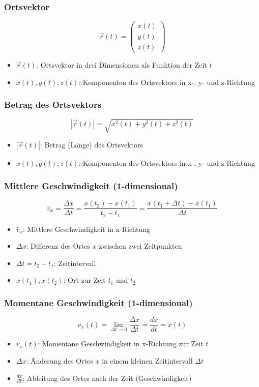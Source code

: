 \documentclass[a4paper, 8pt]{extarticle}
\begin{document}
\begin{landscape}
\begin{multicols*}{3}
\subsubsection{Ortsvektor}
\[
\vec{r}(t) = \begin{pmatrix} x(t) \\ y(t) \\ z(t) \end{pmatrix}
\]
{\footnotesize
\begin{itemize}
    \item \( \vec{r}(t) \): Ortsvektor in drei Dimensionen als Funktion der Zeit \( t \)
    \item \( x(t), y(t), z(t) \): Komponenten des Ortsvektors in x-, y- und z-Richtung
\end{itemize}
}

\subsubsection{Betrag des Ortsvektors}
\[
|\vec{r}(t)| = \sqrt{x^2(t) + y^2(t) + z^2(t)}
\]
{\footnotesize
\begin{itemize}
    \item \( |\vec{r}(t)| \): Betrag (Länge) des Ortsvektors
    \item \( x(t), y(t), z(t) \): Komponenten des Ortsvektors in x-, y- und z-Richtung
\end{itemize}
}

\subsubsection{Mittlere Geschwindigkeit (1-dimensional)}
\[
\bar{v}_x = \frac{\Delta x}{\Delta t} = \frac{x(t_2) - x(t_1)}{t_2 - t_1} = \frac{x(t_1 + \Delta t) - x(t_1)}{\Delta t}
\]
{\footnotesize
\begin{itemize}
    \item \( \bar{v}_x \): Mittlere Geschwindigkeit in x-Richtung
    \item \( \Delta x \): Differenz des Ortes \( x \) zwischen zwei Zeitpunkten
    \item \( \Delta t = t_2 - t_1 \): Zeitintervall
    \item \( x(t_1), x(t_2) \): Ort zur Zeit \( t_1 \) und \( t_2 \)
\end{itemize}
}

\subsubsection{Momentane Geschwindigkeit (1-dimensional)}
\[
v_x(t) = \lim_{\Delta t \to 0} \frac{\Delta x}{\Delta t} = \frac{dx}{dt} = \dot{x}(t)
\]
{\footnotesize
\begin{itemize}
    \item \( v_x(t) \): Momentane Geschwindigkeit in x-Richtung zur Zeit \( t \)
    \item \( \Delta x \): Änderung des Ortes \( x \) in einem kleinen Zeitintervall \( \Delta t \)
    \item \( \frac{dx}{dt} \): Ableitung des Ortes nach der Zeit (Geschwindigkeit)
\end{itemize}
}


\end{multicols*}
\end{landscape}
\end{document}
